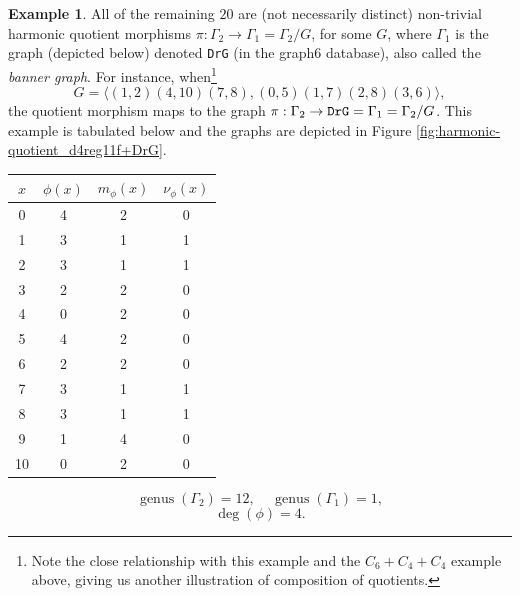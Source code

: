 \documentclass[12pt,letterpaper]{article}
\theoremstyle{definition}
\newtheorem{example}[theorem]{Example}
\DeclareMathOperator{\genus}{genus}
\begin{document}
\begin{example}
{All of the remaining $20$ are (not necessarily distinct)
non-trivial harmonic quotient morphisms
$\pi: \Gamma_2\to \Gamma_1=\Gamma_2/G$, for some $G$, where
$\Gamma_1$ is the graph (depicted below) denoted
{\tt DrG} (in the graph6 database), also called the {\it banner graph}.
For instance, when\footnote{Note the
close relationship with this example and the $C_6+C_4+C_4$ example above,
giving us another illustration of composition of quotients.}
\[
G = \langle  (1,2)(4,10)(7,8), (0,5)(1,7)(2,8)(3,6)\rangle ,
\]
the quotient morphism maps to the  graph
$\pi: \Gamma_2\to {\tt DrG}=\Gamma_1=\Gamma_2/G $. This example
is tabulated below and the graphs are depicted in
Figure \ref{fig:harmonic-quotient_d4reg11f+DrG}. 

\begin{center}
\begin{tabular}{c|c|c|c}  
  $x$ & $\phi(x)$ & $m_\phi(x)$ & $\nu_\phi(x)$ \\ \hline
  0   &    4   &        2         &  0   \\ 
  1   &    3   &        1         &  1  \\ 
  2   &    3   &        1         &  1  \\ 
  3   &    2   &        2         &  0  \\ 
  4   &    0   &        2         &  0   \\
  5   &    4   &        2         &  0   \\
  6   &    2   &        2         &  0   \\
  7   &    3   &        1         &  1   \\
  8   &    3   &        1         &  1   \\
  9   &    1   &        4         &  0   \\
  10   &   0   &        2         &  0  \\   
\end{tabular}
\end{center}

\[
  \genus(\Gamma_2) =12,\ \ \ \ \
  \genus(\Gamma_1) =1,
\]
\[
\deg(\phi) =4.
\]

}
\end{example}
\end{document}
